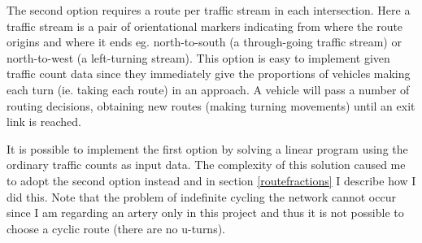The second option requires a route per traffic stream in each intersection. Here a traffic stream is a pair of orientational markers indicating from where the route origins and where it ends eg. north-to-south (a through-going traffic stream) or north-to-west (a left-turning stream). This option is easy to implement given traffic count data since they immediately give the proportions of vehicles making each turn (ie. taking each route) in an approach. A vehicle will pass a number of routing decisions, obtaining new routes (making turning movements) until an exit link is reached.

It is possible to implement the first option by solving a linear program using the ordinary traffic counts as input data. The complexity of this solution caused me to adopt the second option instead and in section \ref{routefractions} I describe how I did this. Note that the problem of indefinite cycling the network cannot occur since I am regarding an artery only in this project and thus it is not possible to choose a cyclic route (there are no u-turns).
